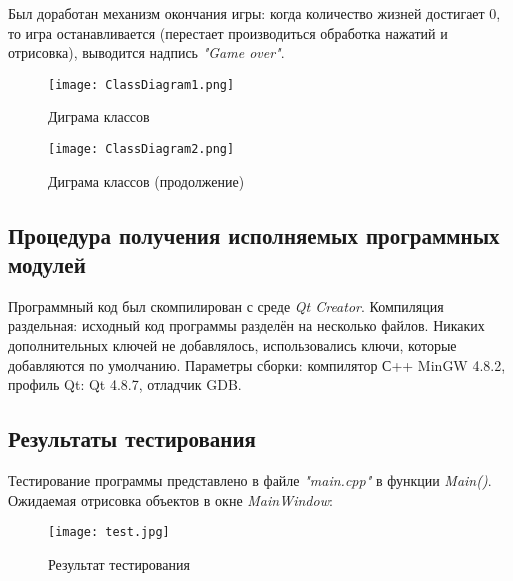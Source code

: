 \documentclass[a4paper,14pt]{article}
\begin{document}
Был доработан механизм окончания игры: когда количество жизней достигает 0, то игра останавливается (перестает производиться обработка нажатий и отрисовка), выводится надпись \textit{"Game over"}.

\begin{figure}[H]
	\centering
	\texttt{[image: ClassDiagram1.png]}
	\caption{Диграма классов}	
\end{figure}
\begin{figure}[H]
	\centering
	\texttt{[image: ClassDiagram2.png]}
	\caption{Диграма классов (продолжение)}	
\end{figure}

\subsection{Процедура получения исполняемых программных модулей}
Программный код был скомпилирован с среде \textit{Qt Creator}. Компиляция раздельная: исходный код программы разделён на несколько файлов. Никаких дополнительных ключей не добавлялось, использовались ключи, которые добавляются по умолчанию. Параметры сборки: компилятор С++ MinGW 4.8.2, профиль Qt: Qt 4.8.7, отладчик GDB.
\subsection{Результаты тестирования}
Тестирование программы представлено в файле \textit{"main.cpp"} в функции \textit{Main()}. Ожидаемая отрисовка объектов в окне \textit{MainWindow}:

\begin{figure}[H]
	\centering
	\texttt{[image: test.jpg]}
	\caption{Результат тестирования}	
\end{figure}

\newpage
\setcounter{figure}{1} 
\setcounter{section}{1} 
\setcounter{subsection}{1} 
\end{document}
